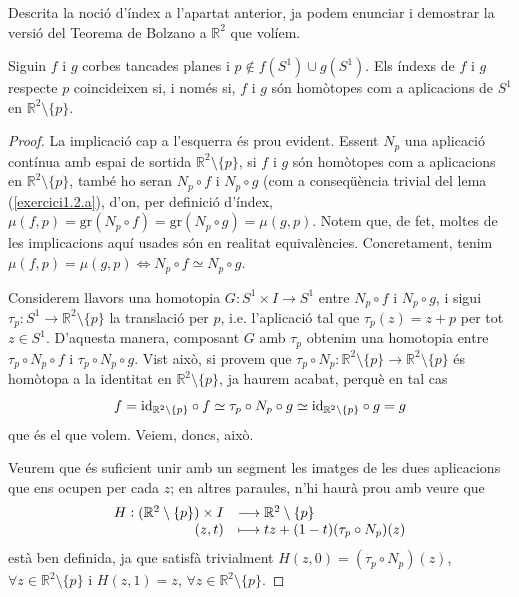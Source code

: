 \documentclass[../main.tex]{subfiles}
\begin{document}
Descrita la noció d'índex a l'apartat anterior, ja podem enunciar i demostrar la versió del Teorema de Bolzano a $\mathbb{R}^2$ que volíem.

\begin{prop}
\label{prop:bolzano2dim} Siguin $f$ i $g$ corbes tancades planes i $p\not\in f(S^1)\cup g(S^1)$. Els índexs de $f$ i $g$ respecte $p$ coincideixen si, i només si, $f$ i $g$ són homòtopes com a aplicacions de $S^1$ en $\mathbb{R}^2\setminus\{p\}$.
\end{prop}
\begin{proof}
    La implicació cap a l'esquerra és prou evident. Essent $N_p$ una aplicació contínua amb espai de sortida $\mathbb{R}^2\setminus\{p\}$, si $f$ i $g$ són homòtopes com a aplicacions en $\mathbb{R}^2\setminus\{p\}$, també ho seran $N_p\circ f$ i $N_p\circ g$ (com a conseqüència trivial del lema (\ref{exercici1.2.a}), d'on, per definició d'índex, $\mu(f,p)= \mathrm{gr}(N_p\circ f) = \mathrm{gr}(N_p\circ g) = \mu(g,p)$. Notem que, de fet, moltes de les implicacions aquí usades són en realitat equivalències. Concretament, tenim $\mu(f,p) = \mu(g,p)\Longleftrightarrow N_p\circ f\simeq N_p\circ g$.
    
    Considerem llavors una homotopia $G:S^1\times I\rightarrow S^1$ entre $N_p\circ f$ i $N_p\circ g$, i sigui $\tau_p:S^1\rightarrow \mathbb{R}^2\setminus\{p\}$ la translació per $p$, i.e. l'aplicació tal que $\tau_p(z) = z+p$ per tot $z\in S^1$. D'aquesta manera, composant $G$ amb $\tau_p$ obtenim una homotopia entre $\tau_p\circ N_p\circ f$ i $\tau_p\circ N_p\circ g$. Vist això, si provem que $\tau_p\circ N_p:\mathbb{R}^2\setminus\{p\}\rightarrow \mathbb{R}^2\setminus\{p\}$ és homòtopa a la identitat en $\mathbb{R}^2\setminus\{p\}$, ja haurem acabat, perquè en tal cas
    \begin{equation}
        \notag
        f = \mathrm{id}_{\mathbb{R}^2\setminus\{p\}}\circ f\simeq \tau_p\circ N_p\circ g\simeq \mathrm{id}_{\mathbb{R}^2\setminus\{p\}}\circ g = g
    \end{equation}
    que és el que volem. Veiem, doncs, això.
    
    Veurem que és suficient unir amb un segment les imatges de les dues aplicacions que ens ocupen per cada $z$;  en altres paraules, n'hi haurà prou amb veure que
    \begin{equation}
        \notag
        \begin{array}{rl}
            H:(\mathbb{R}^2\setminus\{p\})\times I & \longrightarrow \mathbb{R}^2\setminus\{p\} \\
            (z,t) & \longmapsto tz+(1-t)(\tau_p\circ N_p)(z)
        \end{array}
    \end{equation}
    està ben definida, ja que satisfà trivialment $H(z,0) = (\tau_p\circ N_p)(z)$, $\forall z\in\mathbb{R}^2\setminus\{p\}$ i $H(z,1)=z$, $\forall z\in \mathbb{R}^2\setminus\{p\}$.
    

\end{proof}
\end{document}
